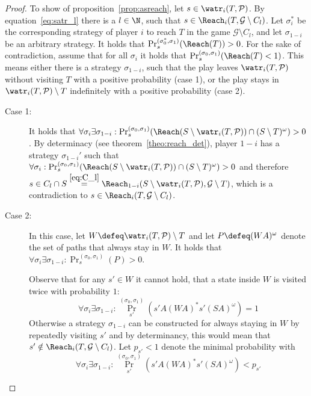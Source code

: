 \begin{proof}
To show \say{$\subseteq$} of proposition~\ref{prop:asreach}, let $s\in\watr_i(T, \mathcal{P})$. By equation~\ref{eq:satr_l} there is a $l\in\N$, such that $s\in\Reach_i(T, \mathcal{G}\setminus C_l)$. Let $\sigma_i^\ast$ be the corresponding strategy of player $i$ to reach $T$ in the game $\mathcal{G}\setminus C_l$, and let $\sigma_{1-i}$ be an arbitrary strategy. It holds that $\Pr_s^{(\sigma_0^\ast, \sigma_1)}(\Reach(T)) > 0$. For the sake of contradiction, assume that for all $\sigma_i$ it holds that $\Pr_s^{(\sigma_0, \sigma_1)}(\Reach(T)< 1)$. This means either there is a strategy $\sigma_{1-i}$, such that the play leaves $\watr_i(T, \mathcal{P})$ without visiting $T$ with a positive probability (case 1), or the play stays in $\watr_i(T, \mathcal{P})\setminus T$ indefinitely with a positive probability (case 2).\begin{description}
    \item[Case 1:] It holds that $\forall\sigma_i\exists\sigma_{1-i}:\Pr_s^{(\sigma_0, \sigma_1)}(\Reach(S\setminus\watr_i(T, \mathcal{P}))\cap (S\setminus T)^\omega) > 0$. By determinacy (see theorem~\ref{theo:reach_det}), player $1-i$ has a strategy $\sigma_{1-i}'$ such that $\forall\sigma_i: \Pr_s^{(\sigma_0, \sigma_1)}(\Reach(S\setminus\watr_i(T, \mathcal{P}))\cap (S\setminus T)^\omega) > 0$ and therefore $s\in C_l\cap S\stackrel{\ref{eq:C_l}}{=}\Reach_{1-i}(S\setminus \watr_i(T, \mathcal{P}), \mathcal{G}\setminus T)$, which is a contradiction to $s\in\Reach_i(T, \mathcal{G}\setminus C_l)$.

    \item[Case 2:] In this case, let $W\defeq\watr_i(T,\mathcal{P})\setminus T$ and let $P\defeq (WA)^\omega$ denote the set of paths that always stay in $W$. It holds that $\forall\sigma_i\exists\sigma_{1-i}: \Pr_s^{(\sigma_0, \sigma_1)}(P) > 0$.
    
    Observe that for any $s'\in W$ it cannot hold, that a state inside $W$ is visited twice with probability $1$:\[
    \forall\sigma_i\exists\sigma_{1-i}: \Pr_{s'}^{(\sigma_0, \sigma_1)}(s'A(WA)^\ast s'(SA)^\omega) = 1\] Otherwise a strategy $\sigma_{1-i}$ can be constructed for always staying in $W$ by repeatedly visiting $s'$ and by determinancy, this would mean that $s'\notin\Reach_i(T, \mathcal{G}\setminus C_l)$. Let $p_{s'}<1$ denote the minimal probability with \[
    \forall\sigma_i\exists\sigma_{1-i}: \Pr_{s'}^{(\sigma_0, \sigma_1)}(s'A(WA)^\ast s'(SA)^\omega) < p_{s'}\]
    


\end{description}
\end{proof}
